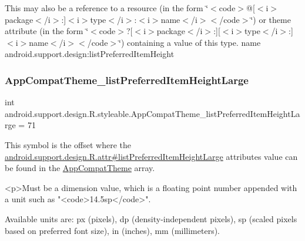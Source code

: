 This may also be a reference to a resource (in the form \char`\"{}$<$code$>$@\mbox{[}$<$i$>$package$<$/i$>$\+:\mbox{]}$<$i$>$type$<$/i$>$\+:$<$i$>$name$<$/i$>$$<$/code$>$\char`\"{}) or theme attribute (in the form \char`\"{}$<$code$>$?\mbox{[}$<$i$>$package$<$/i$>$\+:\mbox{]}\mbox{[}$<$i$>$type$<$/i$>$\+:\mbox{]}$<$i$>$name$<$/i$>$$<$/code$>$\char`\"{}) containing a value of this type.  name android.\+support.\+design\+:list\+Preferred\+Item\+Height \mbox{\label{classandroid_1_1support_1_1design_1_1R_1_1styleable_a183ea7959584cc75c934bead3330b82a}} 
\subsubsection{\texorpdfstring{App\+Compat\+Theme\+\_\+list\+Preferred\+Item\+Height\+Large}{AppCompatTheme\_listPreferredItemHeightLarge}}
{\footnotesize\ttfamily int android.\+support.\+design.\+R.\+styleable.\+App\+Compat\+Theme\+\_\+list\+Preferred\+Item\+Height\+Large = 71\hspace{0.3cm}{\ttfamily [static]}}

This symbol is the offset where the \hyperlink{classandroid_1_1support_1_1design_1_1R_1_1attr_a3adf33dcb6fd984d1d7aee11e167ba4b}{android.\+support.\+design.\+R.\+attr\#list\+Preferred\+Item\+Height\+Large} attribute\textquotesingle{}s value can be found in the \hyperlink{classandroid_1_1support_1_1design_1_1R_1_1styleable_afb351dc8de20cbd4c89abe360373010c}{App\+Compat\+Theme} array.

\begin{DoxyVerb}      <p>Must be a dimension value, which is a floating point number appended with a unit such as "<code>14.5sp</code>".
\end{DoxyVerb}
 Available units are\+: px (pixels), dp (density-\/independent pixels), sp (scaled pixels based on preferred font size), in (inches), mm (millimeters). 

